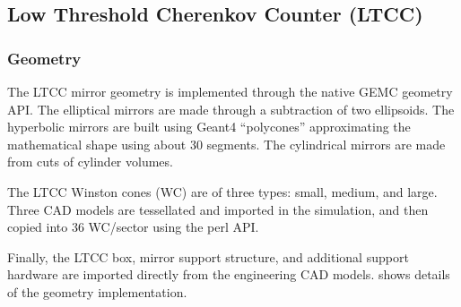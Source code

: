 \subsection{Low Threshold Cherenkov Counter (LTCC)}

\subsubsection{Geometry}
The LTCC mirror geometry is implemented through the native GEMC geometry API.
The elliptical mirrors are made through a subtraction of two ellipsoids.
The hyperbolic mirrors are built using Geant4 ``polycones'' approximating the mathematical shape using about 30 segments.
The cylindrical mirrors are made from cuts of cylinder volumes.

The LTCC Winston cones (WC) are of three types: small, medium, and large. Three CAD models are tessellated and
imported in the simulation, and then copied into 36 WC/sector using the perl API.

Finally, the LTCC box, mirror support structure, and additional support hardware are imported directly from
the engineering CAD models.  shows details of the geometry implementation.


